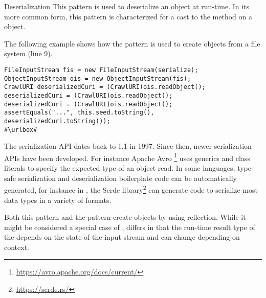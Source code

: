 \begin{pattern}{Deserialization}
This pattern is used to deserialize an object at run-time.
In its more common form,
this pattern is characterized for a cast to the  method on a  object.

\instances{}
The following example shows how the \thisp{} pattern is used to create objects from a file system (line 9).

\def\urlvar{http://bit.ly/internetarchive_heritrix3_2SF4j7k}
\begin{verbatim}
FileInputStream fis = new FileInputStream(serialize);
ObjectInputStream ois = new ObjectInputStream(fis);
CrawlURI deserializedCuri = (CrawlURI)ois.readObject();
deserializedCuri = (CrawlURI)ois.readObject();
deserializedCuri = (CrawlURI)ois.readObject();
assertEquals("...", this.seed.toString(), deserializedCuri.toString());
#\urlbox#
\end{verbatim}

\issues{}
The serialization API dates back to \java{} 1.1 in 1997.
Since then, newer serialization APIs have been developed.
For instance Apache Avro%
\footnote{\url{https://avro.apache.org/docs/current/}}
uses generics and class literals to specify the expected type of an object read. 
In some languages,
type-safe serialization and deserialization boilerplate code can be automatically generated,
for instance in \rust{},
the Serde library\footnote{\url{https://serde.rs/}}
can generate code to serialize most data types
in a variety of formats.

Both this pattern and the  pattern create objects by using reflection.
While it might be considered a special case of , 
\thisp{} differs in that the run-time result type of the  depends on the state of the input stream and can change depending on context.
 
\end{pattern}